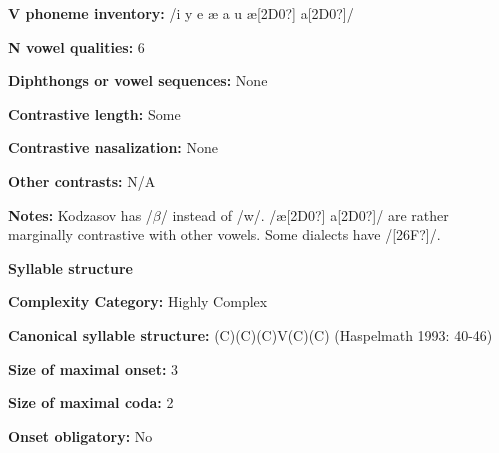 \begin{styleBody}
\textbf{V phoneme inventory:} /i y e æ a u æ[2D0?] a[2D0?]/
\end{styleBody}

\begin{styleBody}
\textbf{N vowel qualities:} 6
\end{styleBody}

\begin{styleBody}
\textbf{Diphthongs or vowel sequences:} None
\end{styleBody}

\begin{styleBody}
\textbf{Contrastive length:} Some
\end{styleBody}

\begin{styleBody}
\textbf{Contrastive nasalization:} None
\end{styleBody}

\begin{styleBody}
\textbf{Other contrasts:} N/A
\end{styleBody}

\begin{styleBody}
\textbf{Notes:} Kodzasov has /$\beta $/ instead of /w/. /æ[2D0?] a[2D0?]/ are rather marginally contrastive with other vowels. Some dialects have /[26F?]/.
\end{styleBody}

\begin{styleBody}
\textbf{Syllable structure}
\end{styleBody}

\begin{styleBody}
\textbf{Complexity Category:} Highly Complex
\end{styleBody}

\begin{styleBody}
\textbf{Canonical syllable structure:} (C)(C)(C)V(C)(C)\textbf{ }(Haspelmath 1993: 40-46)
\end{styleBody}

\begin{styleBody}
\textbf{Size of maximal onset:} 3
\end{styleBody}

\begin{styleBody}
\textbf{Size of maximal coda:} 2
\end{styleBody}

\begin{styleBody}
\textbf{Onset obligatory:} No
\end{styleBody}

